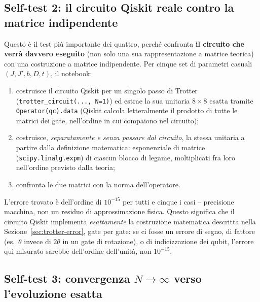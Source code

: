 \documentclass[11pt,a4paper]{article}
\begin{document}
\subsection{Self-test 2: il circuito Qiskit reale contro la matrice indipendente}
\label{subsec:selftest2}

Questo è il test più importante dei quattro, perché confronta
\textbf{il circuito che verrà davvero eseguito} (non solo una sua
rappresentazione a matrice teorica) con una costruzione a matrice
indipendente. Per cinque set di parametri casuali $(J,J',b,D,t)$, il
notebook:
\begin{enumerate}
\item costruisce il circuito Qiskit per un singolo passo di Trotter
(\texttt{trotter\_circuit(...,\,N{=}1)}) ed estrae la sua unitaria
$8\times8$ esatta tramite \texttt{Operator(qc).data} (Qiskit calcola
letteralmente il prodotto di tutte le matrici dei gate, nell'ordine in
cui compaiono nel circuito);
\item costruisce, \emph{separatamente e senza passare dal circuito}, la
stessa unitaria a partire dalla definizione matematica: esponenziale di
matrice (\texttt{scipy.linalg.expm}) di ciascun blocco di legame,
moltiplicati fra loro nell'ordine previsto dalla teoria;
\item confronta le due matrici con la norma dell'operatore.
\end{enumerate}
L'errore trovato è dell'ordine di $10^{-15}$ per tutti e cinque i casi --
precisione macchina, non un residuo di approssimazione fisica. Questo
significa che il circuito Qiskit implementa \emph{esattamente} la
costruzione matematica descritta nella Sezione~\ref{sec:trotter-error},
gate per gate: se ci fosse un errore di segno, di fattore (es.\ $\theta$
invece di $2\theta$ in un gate di rotazione), o di indicizzazione dei
qubit, l'errore qui misurato sarebbe dell'ordine dell'unità, non
$10^{-15}$.

\subsection{Self-test 3: convergenza $N\to\infty$ verso l'evoluzione esatta}
\label{subsec:selftest3}
\end{document}

